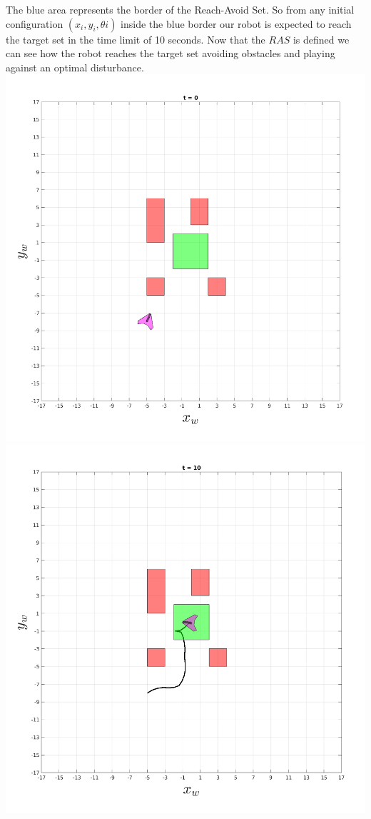     The blue area represents the border of the Reach-Avoid Set. So from any initial configuration $(x_{i},y_{i},\theta{i})$ inside the blue border our robot is expected to reach the target set in the time limit of 10 seconds. 
    Now that the $RAS$ is defined we can see how the robot reaches the target set avoiding obstacles and playing against an optimal disturbance.
    \includegraphics[scale=0.3]{figures/staticTRAJ1.png}
    \includegraphics[scale=0.33]{figures/staticTRAJ2.png}
